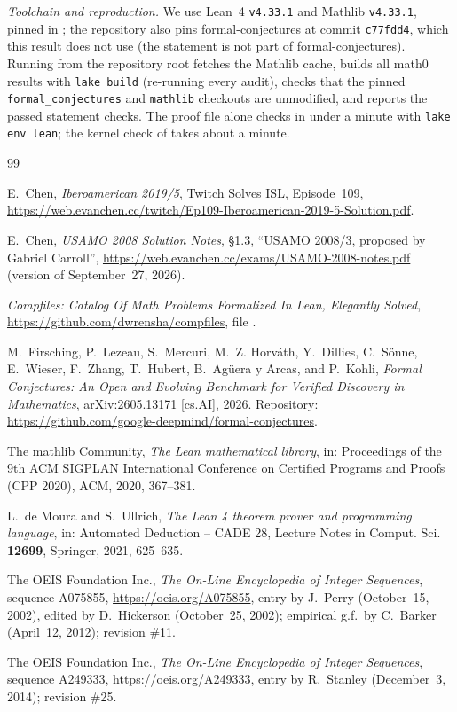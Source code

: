 \documentclass[11pt]{amsart}
\theoremstyle{plain}
\theoremstyle{definition}
\begin{document}
\emph{Toolchain and reproduction.} We use Lean~4 \cite{Lean4} \texttt{v4.33.1} and Mathlib \cite{Mathlib} \texttt{v4.33.1}, pinned in ; the repository also pins formal-conjectures \cite{FC} at commit \texttt{c77fdd4}, which this result does not use (the statement is not part of formal-conjectures). Running  from the repository root fetches the Mathlib cache, builds all math0 results with \texttt{lake build} (re-running every audit), checks that the pinned \texttt{formal\_conjectures} and \texttt{mathlib} checkouts are unmodified, and reports the passed statement checks. The proof file alone checks in under a minute with \texttt{lake env lean}; the kernel check of  takes about a minute.

{\footnotesize\raggedright
\begin{thebibliography}{99}

E.~Chen, \emph{Iberoamerican 2019/5}, Twitch Solves ISL, Episode~109, \url{https://web.evanchen.cc/twitch/Ep109-Iberoamerican-2019-5-Solution.pdf}.

E.~Chen, \emph{USAMO 2008 Solution Notes}, \S1.3, ``USAMO 2008/3, proposed by Gabriel Carroll'', \url{https://web.evanchen.cc/exams/USAMO-2008-notes.pdf} (version of September~27, 2026).

\emph{Compfiles: Catalog Of Math Problems Formalized In Lean, Elegantly Solved}, \url{https://github.com/dwrensha/compfiles}, file .

M.~Firsching, P.~Lezeau, S.~Mercuri, M.~Z. Horv\'ath, Y.~Dillies, C.~S\"onne, E.~Wieser, F.~Zhang, T.~Hubert, B.~Ag\"uera y Arcas, and P.~Kohli, \emph{Formal Conjectures: An Open and Evolving Benchmark for Verified Discovery in Mathematics}, arXiv:2605.13171 [cs.AI], 2026. Repository: \url{https://github.com/google-deepmind/formal-conjectures}.

The mathlib Community, \emph{The Lean mathematical library}, in: Proceedings of the 9th ACM SIGPLAN International Conference on Certified Programs and Proofs (CPP 2020), ACM, 2020, 367--381.

L.~de Moura and S.~Ullrich, \emph{The Lean 4 theorem prover and programming language}, in: Automated Deduction -- CADE 28, Lecture Notes in Comput. Sci. \textbf{12699}, Springer, 2021, 625--635.

The OEIS Foundation Inc., \emph{The On-Line Encyclopedia of Integer Sequences}, sequence A075855, \url{https://oeis.org/A075855}, entry by J.~Perry (October~15, 2002), edited by D.~Hickerson (October~25, 2002); empirical g.f.\ by C.~Barker (April~12, 2012); revision \#11.

The OEIS Foundation Inc., \emph{The On-Line Encyclopedia of Integer Sequences}, sequence A249333, \url{https://oeis.org/A249333}, entry by R.~Stanley (December~3, 2014); revision \#25.

\end{thebibliography}
}
\end{document}
